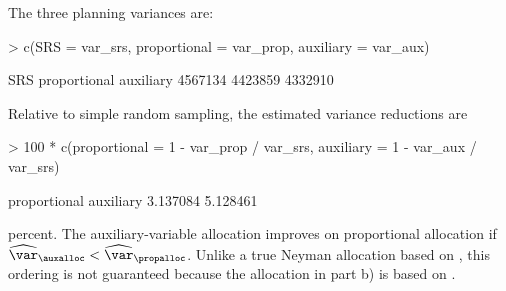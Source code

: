 \begin{Problem}
\begin{Subtask}
\begin{Solution}
        The three planning variances are:

\begin{Schunk}
\begin{Sinput}
> c(SRS = var_srs, proportional = var_prop, auxiliary = var_aux)
\end{Sinput}
\begin{Soutput}
         SRS proportional    auxiliary 
     4567134      4423859      4332910 
\end{Soutput}
\end{Schunk}

        Relative to simple random sampling, the estimated variance reductions
        are

\begin{Schunk}
\begin{Sinput}
> 100 * c(proportional = 1 - var_prop / var_srs,
         auxiliary = 1 - var_aux / var_srs)
\end{Sinput}
\begin{Soutput}
proportional    auxiliary 
    3.137084     5.128461 
\end{Soutput}
\end{Schunk}

        percent. The auxiliary-variable allocation improves on proportional
        allocation if $\widehat{\var}_{\auxalloc} <
        \widehat{\var}_{\propalloc}$. Unlike a true Neyman allocation based on
        , this ordering is not guaranteed because the allocation in
        part b) is based on .
    \end{Solution}
\end{Subtask}
\end{Problem}
